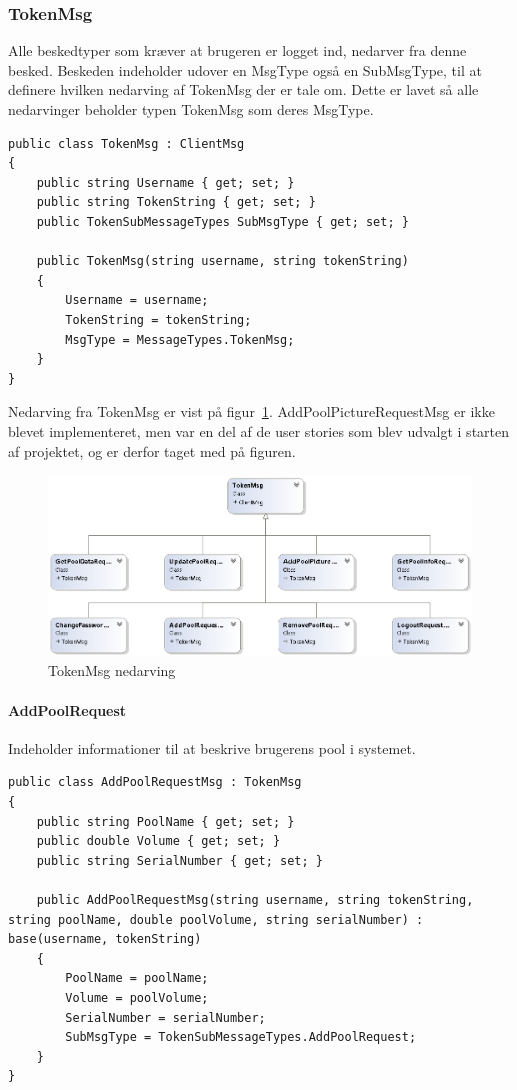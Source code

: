 \subsubsection{TokenMsg}
Alle beskedtyper som kræver at brugeren er logget ind, nedarver fra denne besked. Beskeden indeholder udover en MsgType også en SubMsgType, til at definere hvilken nedarving af TokenMsg der er tale om. Dette er lavet så alle nedarvinger beholder typen TokenMsg som deres MsgType.
\begin{lstlisting}[caption=TokenMsg, label=code:TokenMsg]
public class TokenMsg : ClientMsg
{
	public string Username { get; set; }
	public string TokenString { get; set; }
	public TokenSubMessageTypes SubMsgType { get; set; }
	
	public TokenMsg(string username, string tokenString)
	{
		Username = username;
		TokenString = tokenString;
		MsgType = MessageTypes.TokenMsg;
	}
}
\end{lstlisting}

Nedarving fra TokenMsg er vist på figur~\ref{fig:TokenMsgUML}. AddPoolPictureRequestMsg er ikke blevet implementeret, men var en del af de user stories som blev udvalgt i starten af projektet, og er derfor taget med på figuren.
\begin{figure}
	\centering
	\includegraphics[width=0.9\linewidth]{figs/connection/TokenMsgUML.png}
	\caption{TokenMsg nedarving}
	\label{fig:TokenMsgUML}
\end{figure}

\paragraph{AddPoolRequest}
Indeholder informationer til at beskrive brugerens pool i systemet.
\begin{lstlisting}[caption=AddPoolRequest, label=code:AddPoolRequest]
public class AddPoolRequestMsg : TokenMsg
{
	public string PoolName { get; set; }
	public double Volume { get; set; }
	public string SerialNumber { get; set; }
	
	public AddPoolRequestMsg(string username, string tokenString, string poolName, double poolVolume, string serialNumber) : base(username, tokenString)
	{
		PoolName = poolName;
		Volume = poolVolume;
		SerialNumber = serialNumber;
		SubMsgType = TokenSubMessageTypes.AddPoolRequest;
	}
}
\end{lstlisting}

